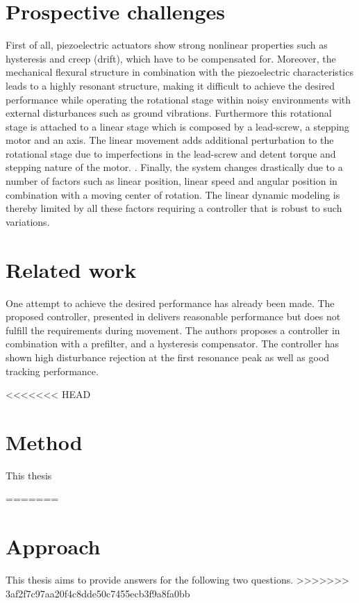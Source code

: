 \section{Prospective challenges}\label{sec:prospectiveChallanges}
First of all, piezoelectric actuators show strong nonlinear properties such as hysteresis and creep (drift), which have to be compensated for.\citep{Piezo:2008} Moreover, the mechanical flexural structure in combination with the piezoelectric characteristics leads to a highly resonant structure, making it difficult to achieve the desired performance while operating the rotational stage within noisy environments with external disturbances such as ground vibrations. Furthermore this rotational stage is attached to a linear stage which is composed by a lead-screw, a stepping motor and an axis. The linear movement adds additional perturbation to the rotational stage due to imperfections in the lead-screw and detent torque and stepping nature of the motor. \citep{ButcherController:2015}. Finally, the system changes drastically due to a number of factors such as linear position, linear speed and angular position in combination with a moving center of rotation. The linear dynamic modeling is thereby limited by all these factors requiring a controller that is robust to such variations.

\section{Related work}
One attempt to achieve the desired performance has already been made. The proposed controller, presented in \citep{ButcherController:2015} delivers reasonable performance but does not fulfill the requirements during movement. The authors proposes a \abbrPID controller in combination with a prefilter, and a hysteresis compensator. The controller has shown high disturbance rejection at the first resonance peak as well as good tracking performance.

<<<<<<< HEAD
\section{Method}
This thesis

=======
\section{Approach}
This thesis aims to provide answers for the following two questions.
>>>>>>> 3af2f7c97aa20f4c8dde50c7455ecb3f9a8fa0bb

